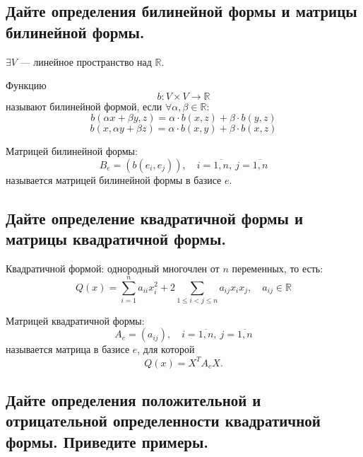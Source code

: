 \subsection{Дайте определения билинейной формы и матрицы билинейной формы.}

\begin{definition}
    $\exists V$ --- линейное пространство над $\mathbb{R}$.
    
    Функцию
    \[
        b: V \times V \to \mathbb{R}
    \]
    называют билинейной формой, если $\forall \alpha, \beta \in \mathbb{R}$:
    \[
        b(\alpha x + \beta y, z) = \alpha \cdot  b(x, z) + \beta \cdot b(y, z)
    \]
    \[
        b(x, \alpha y + \beta z) = \alpha \cdot b(x, y)   + \beta \cdot b(x, z)
    \]
\end{definition}

\begin{definition}
    Матрицей билинейной формы:
    \[
        B_e = (b(e_i, e_j)),\quad i = \overline{1, n},\ j = \overline{1, n}
    \]
    называется матрицей билинейной формы в базисе $e$.
\end{definition}


\subsection{Дайте определение квадратичной формы и матрицы квадратичной формы.}

\begin{definition}
    Квадратичной формой: однородный многочлен от $n$ переменных, то есть:
    \[
        Q(x) = \sum_{i = 1}^{n} a_{ii}x_i^2 + 2\sum_{1 \leq i < j \leq n} a_{ij}x_i x_j,\quad a_{ij} \in \mathbb{R}
    \]
\end{definition}

\begin{definition}

    
    Матрицей квадратичной формы:
    \[
        A_e = (a_{ij}),\quad i = \overline{1,n},\ j = \overline{1,n}
    \]
    называется матрица в базисе $e$, для которой
    \[
        Q(x) = X^T A_e X.
    \]

\end{definition}


\subsection{Дайте определения положительной и отрицательной определенности квадратичной формы. Приведите примеры.}

